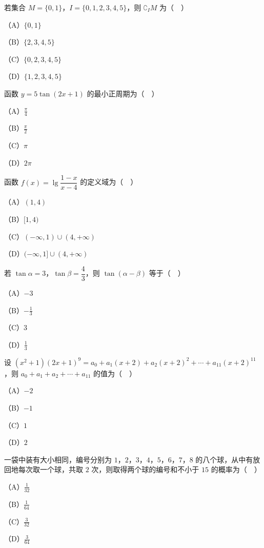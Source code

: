 


\begin{question}
若集合 $M=\{0,1\}$，$I=\{0,1,2,3,4,5\}$，则 $\complement_IM$ 为（　）

（A）$\{0,1\}$

（B）$\{2,3,4,5\}$

（C）$\{0,2,3,4,5\}$

（D）$\{1,2,3,4,5\}$

\end{question}
\begin{question}
函数 $y=5\tan(2x+1)$ 的最小正周期为（　）

（A）$\frac{\pi}{4}$

（B）$\frac{\pi}{2}$

（C）$\pi$

（D）$2\pi$

\end{question}
\begin{question}
函数 $f(x)=\lg\dfrac{1-x}{x-4}$ 的定义域为（　）

（A）$(1,4)$

（B）$[1,4)$

（C）$(-\infty,1)\cup(4,+\infty)$

（D）$(-\infty,1]\cup(4,+\infty)$

\end{question}
\begin{question}
若 $\tan\alpha=3$，$\tan\beta=\dfrac43$，则 $\tan(\alpha-\beta)$ 等于（　）

（A）$-3$

（B）$-\frac13$

（C）$3$

（D）$\frac13$

\end{question}
\begin{question}
设 $(x^2+1)(2x+1)^9=a_0+a_1(x+2)+a_2(x+2)^2+\cdots+a_{11}(x+2)^{11}$，则 $a_0+a_1+a_2+\cdots+a_{11}$ 的值为（　）

（A）$-2$

（B）$-1$

（C）$1$

（D）$2$

\end{question}
\begin{question}
一袋中装有大小相同，编号分别为 $1$，$2$，$3$，$4$，$5$，$6$，$7$，$8$ 的八个球，从中有放回地每次取一个球，共取 $2$ 次，则取得两个球的编号和不小于 $15$ 的概率为（　）

（A）$\frac1{32}$

（B）$\frac1{64}$

（C）$\frac3{32}$

（D）$\frac3{64}$

\end{question}
